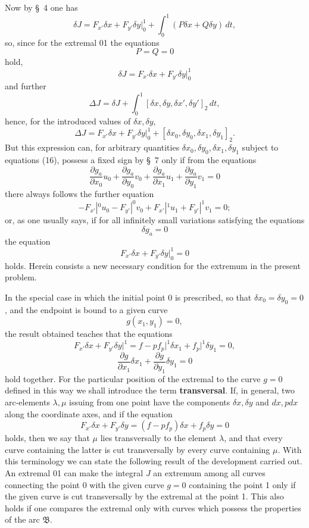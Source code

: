 \documentclass[11pt,a4paper,leqno]{article}
\begin{document}
Now by \S~4 one has
\[
\delta J=F_{x'}\delta x+F_{y'}\delta y\bigg|_0^1+\int_0^1(P\delta x+Q\delta y)\,dt,
\]
so, since for the extremal 01 the equations
\[
P=Q=0
\]
hold,
\[
\delta J=F_{x'}\delta x+F_{y'}\delta y\bigg|_0^1
\]
and further
\[
\Delta J=\delta J+\int_0^1[\delta x,\delta y,\delta x',\delta y']_2\,dt,
\]
hence, for the introduced values of $\delta x,\delta y$,
\[
\Delta J=F_{x'}\delta x+F_{y'}\delta y\bigg|_0^1+[\delta x_0,\delta y_0,\delta x_1,\delta y_1]_2.
\]
But this expression can, for arbitrary quantities $\delta x_0,\delta y_0,\delta x_1,\delta y_1$ subject to equations (16),
possess a fixed sign by \S~7 only if from the equations
\[
\frac{\partial g_a}{\partial x_0}u_0+\frac{\partial g_a}{\partial y_0}v_0+\frac{\partial g_a}{\partial x_1}u_1+\frac{\partial g_a}{\partial y_1}v_1=0
\]
there always follows the further equation
\[
-F_{x'}|^0u_0-F_{y'}|^0v_0+F_{x'}|^1u_1+F_{y'}|^1v_1=0;
\]
or, as one usually says, if for all infinitely small variations satisfying the equations
\[
\delta g_a=0
\]
the equation
\[
F_{x'}\delta x+F_{y'}\delta y\bigg|_0^1=0
\]
holds. Herein consists a new necessary condition for the extremum in the present problem.

In the special case in which the initial point 0 is prescribed, so that $\delta x_0=\delta y_0=0$, and the endpoint is bound to a given curve
\[
g(x_1,y_1)=0,
\]
the result obtained teaches that the equations
\[
F_{x'}\delta x+F_{y'}\delta y\bigg|^1=f-pf_p\big|^1\delta x_1+f_p\big|^1\delta y_1=0,
\]
\[
\frac{\partial g}{\partial x_1}\delta x_1+\frac{\partial g}{\partial y_1}\delta y_1=0
\]
hold together. For the particular position of the extremal to the curve $g=0$ defined in this way we shall introduce the term \textbf{transversal}. If, in general, two arc-elements $\lambda,\mu$ issuing from one point have the components $\delta x,\delta y$ and $dx,pdx$ along the coordinate axes, and if the equation
\[
F_{x'}\delta x+F_{y'}\delta y=(f-pf_p)\delta x+f_p\delta y=0
\]
holds, then we say that $\mu$ lies transversally to the element $\lambda$, and that every curve containing the latter is cut transversally by every curve containing $\mu$. With this terminology we can state the following result of the development carried out. An extremal 01 can make the integral $J$ an extremum among all curves connecting the point 0 with the given curve $g=0$ containing the point 1 only if the given curve is cut transversally by the extremal at the point 1. This also holds if one compares the extremal only with curves which possess the properties of the arc $\mathfrak{B}$.
\end{document}
